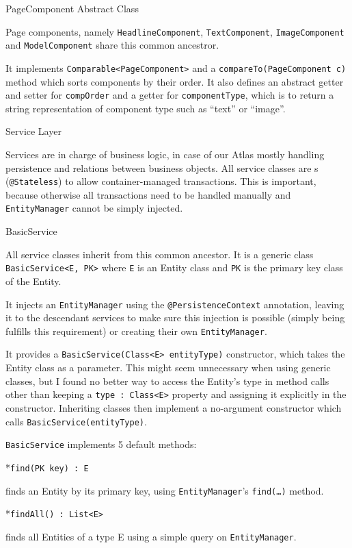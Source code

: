 \secc PageComponent Abstract Class

Page components, namely {\tt HeadlineComponent}, {\tt TextComponent}, {\tt ImageComponent} and {\tt ModelComponent} share 
this common ancestror.

It implements {\tt Comparable<PageComponent>} and a {\tt compareTo(PageComponent c)} method which sorts components by their order. It also defines an abstract getter and setter for {\tt compOrder} and a getter for {\tt componentType}, which is to return a string representation of component type such as “text” or “image”.

\sec Service Layer

Services are in charge of business logic, in case of our Atlas mostly handling persistence and relations between business objects. All service classes are s ({\tt @Stateless}) to allow container-managed transactions. This is important, because otherwise all transactions need to be handled manually and  {\tt EntityManager} cannot be simply injected.

\secc BasicService

All service classes inherit from this common ancestor. It is a generic class {\tt BasicService<E, PK>} where {\tt E} is an Entity class and {\tt PK} is the primary key class of the Entity.

It injects an {\tt EntityManager} using the {\tt @PersistenceContext} annotation, leaving it to the descendant services to make sure this injection is possible (simply being  fulfills this requirement) or creating their own {\tt EntityManager}.

It provides a {\tt BasicService(Class<E> entityType)} constructor, which takes the Entity class as a parameter. This might seem unnecessary when using generic classes, but I found no better way to access the Entity’s type in method calls other than keeping a {\tt type : Class<E>} property and assigning it explicitly in the constructor. Inheriting classes then implement a no-argument constructor which calls {\tt BasicService(entityType)}.

{\tt BasicService} implements 5 default  methods:

\begitems

*{\tt find(PK key) : E}

finds an Entity by its primary key, using {\tt EntityManager}’s {\tt find(…)} method.

*{\tt findAll() : List<E>}

finds all Entities of a type {E} using a simple  query on {\tt EntityManager}.

